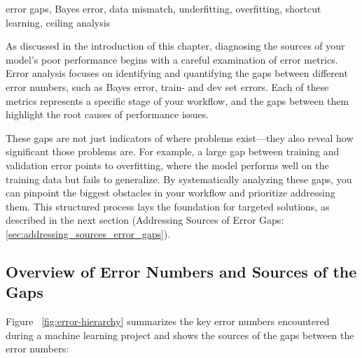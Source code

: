 \documentclass[12pt,openany, draft]{book}
\begin{document}
\begin{keywordsbox}
error gaps, Bayes error, data mismatch, underfitting, overfitting, shortcut learning, ceiling analysis
\end{keywordsbox}

As discussed in the introduction of this chapter, diagnosing the sources of your model’s poor performance begins with a careful examination of error metrics. Error analysis focuses on identifying and quantifying the gaps between different error numbers, such as Bayes error, train- and dev set errors. Each of these metrics represents a specific stage of your workflow, and the gaps between them highlight the root causes of performance issues. \newline

These gaps are not just indicators of where problems exist—they also reveal how significant those problems are. For example, a large gap between training and validation error points to overfitting, where the model performs well on the training data but fails to generalize. By systematically analyzing these gaps, you can pinpoint the biggest obstacles in your workflow and prioritize addressing them. This structured process lays the foundation for targeted solutions, as described in the next section (Addressing Sources of Error Gaps: \ref{sec:addressing_sources_error_gaps}).

\subsection{Overview of Error Numbers and Sources of the Gaps}

Figure ~\ref{fig:error-hierarchy} summarizes the key error numbers encountered during a machine learning project and shows the sources of the gaps between the error numbers:
\end{document}

